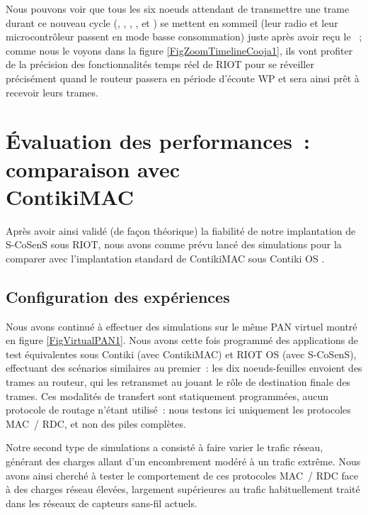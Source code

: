 Nous pouvons voir que tous les six noeuds attendant de transmettre une
trame durant ce nouveau cycle (, , ,
,  et ) se mettent en sommeil (leur
radio et leur microcontrôleur passent en mode basse consommation) juste
après avoir reçu le ~; comme nous le voyons dans la figure
\vref{FigZoomTimelineCooja1}, ils vont profiter de la précision des
fonctionnalités temps réel de RIOT pour se réveiller précisément quand
le routeur passera en période d'écoute WP et sera ainsi prêt à recevoir
leurs trames.


\section[\'Evaluation des performances~: comparaison avec ContikiMAC]
        {\'Evaluation des performances~: comparaison avec \\
           ContikiMAC}
\label{SecEvalPerfSCosens}

Après avoir ainsi validé (de façon théorique) la fiabilité de notre
implantation de S-CoSenS sous RIOT, nous avons comme prévu lancé des
simulations pour la comparer avec l'implantation standard de ContikiMAC
sous Contiki OS \cite{KR-RR-8777-2015}.


\subsection{Configuration des expériences}
\label{SubsecCfgExp2}

Nous avons continué à effectuer des simulations sur le même PAN virtuel
montré en figure \vref{FigVirtualPAN1}. Nous avons cette fois
programmé des applications de test équivalentes sous Contiki (avec
ContikiMAC) et RIOT OS (avec S-CoSenS), effectuant des scénarios similaires
au premier~: les dix noeuds-feuilles envoient des trames au routeur, qui
les retransmet au  jouant le rôle de destination finale des
trames. Ces modalités de transfert sont statiquement programmées, aucun
protocole de routage n'étant utilisé~: nous testons ici uniquement les
protocoles MAC~/ RDC, et non des piles complètes.

Notre second type de simulations a consisté à faire varier le trafic réseau,
générant des charges allant d'un encombrement modéré à un trafic extrême.
Nous avons ainsi cherché à tester le comportement de ces protocoles MAC~/
RDC face à des charges réseau élevées, largement supérieures au trafic
habituellement traité dans les réseaux de capteurs sans-fil actuels.

